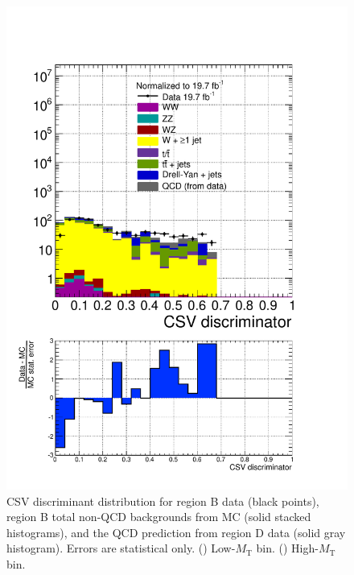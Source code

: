 \begin{figure}[hbtp]
\begin{center}
    \includegraphics[width=\cmsFigWidth]{figures/dataVsMCQCD_CSV_highMT_v87}
    \caption{CSV discriminant distribution for region B data (black points), region B total non-QCD backgrounds from MC (solid stacked histograms), and the QCD prediction from region D data (solid gray histogram).  Errors are statistical only. (\cmsLeft) Low-$M_{\text{T}}$ bin. (\cmsRight) High-$M_{\text{T}}$ bin.}
    \label{fig:regB-data-MC-bTagDiscrim}
  \end{center}
\end{figure}

\clearpage

